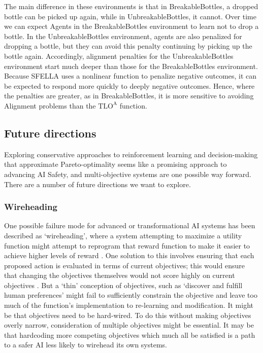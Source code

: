 The main difference in these environments is that in BreakableBottles, a dropped bottle can be picked up again, while in UnbreakableBottles, it cannot. Over time we can expect Agents in the BreakableBottles environment to learn not to drop a bottle. In the UnbreakableBottles environment, agents are also penalized for dropping a bottle, but they can avoid this penalty continuing by picking up the bottle again. Accordingly, alignment penalties for the UnbreakableBottles environment start much deeper than those for the BreakableBottles environment. Because SFELLA uses a nonlinear function to penalize negative outcomes, it can be expected to respond more quickly to deeply negative outcomes. Hence, where the penalties are greater, as in BreakableBottles, it is more sensitive to avoiding Alignment problems than the $\text{TLO}^\text{A}$ function.


\subsection{Future directions}

Exploring conservative approaches to reinforcement learning and decision-making that approximate Pareto-optimality seems like a promising approach to advancing AI Safety, and multi-objective systems are one possible way forward. There are a number of future directions we want to explore.


\subsubsection{Wireheading}

One possible failure mode for advanced or transformational AI systems has been described as `wireheading', where a system attempting to maximize a utility function might attempt to reprogram that reward function to make it easier to achieve higher levels of reward \cite{demski_a_stable_2017}. One solution to this involves ensuring that each proposed action is evaluated in terms of current objectives; this would ensure that changing the objectives themselves would not score highly on current objectives \cite{dewey_learning_2011}. But a `thin' conception of objectives, such as `discover and fulfill human preferences' might fail to sufficiently constrain the objective and leave too much of the function's implementation to re-learning and modification. It might be that objectives need to be hard-wired. To do this without making objectives overly narrow, consideration of multiple objectives might be essential. It may be that hardcoding more competing objectives which much all be satisfied is a path to a safer AI less likely to wirehead its own systems.

